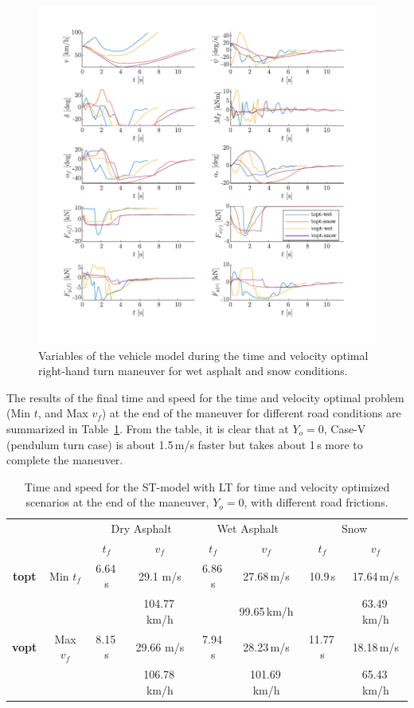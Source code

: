 \begin{figure}[h!]
    \centering
    \includegraphics{figures/pep2_FricComp_detailplot.pdf}
    \caption{Variables of the vehicle model during the time and velocity optimal right-hand turn maneuver for wet asphalt and snow conditions.}
    \label{fig:pep2_FricComp_detailplot}
\end{figure}

\clearpage
The results of the final time and speed for the time and velocity optimal problem (Min $t$, and Max $v_f$) at the end of the maneuver for different road conditions are summarized in Table~\ref{tab:opt_res_num_pep2_fric}. 
From the table, it is clear that at $Y_o = 0$, Case-V (pendulum turn case) is about 1.5\,m/s faster but takes about 1\,s more to complete the maneuver. 
\begin{table}[h!]
    \centering
    \begin{tabular}{c|c|c|c|c|c|c|c}
        & & \multicolumn{2}{c|}{Dry Asphalt} & \multicolumn{2}{c|}{Wet Asphalt} & \multicolumn{2}{c}{Snow}\\
        & & $t_f$ & $v_f$ & $t_f$ & $v_f$ & $t_f$ & $v_f$\\
        \hline
        \textbf{topt} & Min $t_f$ & 6.64\,s & 29.1 m/s & 6.86\,s & 27.68\,m/s & 10.9\,s & 17.64\,m/s\\
        & & & 104.77\,km/h & & 99.65\,km/h & & 63.49\,km/h\\
        \textbf{vopt} & Max $v_f$ & 8.15\,s & 29.66 m/s & 7.94\,s & 28.23\,m/s & 11.77\,s & 18.18\,m/s\\
        & & & 106.78\,km/h & & 101.69\,km/h & & 65.43\,km/h\\
    \end{tabular}
    \caption{Time and speed for the ST-model with LT for time and velocity optimized scenarios at the end of the maneuver, $Y_o = 0$, with different road frictions.}
    \label{tab:opt_res_num_pep2_fric}
\end{table}

